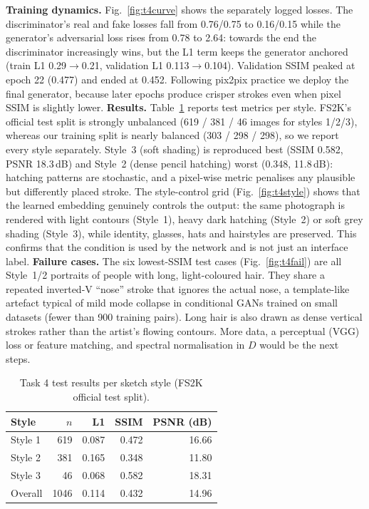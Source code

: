 \documentclass[conference]{IEEEtran}
\begin{document}
\textbf{Training dynamics.} Fig.~\ref{fig:t4curve} shows the separately logged losses. The discriminator's real and fake losses fall from 0.76/0.75 to 0.16/0.15 while the generator's adversarial loss rises from 0.78 to 2.64: towards the end the discriminator increasingly wins, but the L1 term keeps the generator anchored (train L1 0.29$\rightarrow$0.21, validation L1 0.113$\rightarrow$0.104). Validation SSIM peaked at epoch 22 (0.477) and ended at 0.452. Following pix2pix practice we deploy the final generator, because later epochs produce crisper strokes even when pixel SSIM is slightly lower.
\textbf{Results.} Table~\ref{tab:t4} reports test metrics per style. FS2K's official test split is strongly unbalanced (619 / 381 / 46 images for styles 1/2/3), whereas our training split is nearly balanced (303 / 298 / 298), so we report every style separately. Style~3 (soft shading) is reproduced best (SSIM 0.582, PSNR 18.3\,dB) and Style~2 (dense pencil hatching) worst (0.348, 11.8\,dB): hatching patterns are stochastic, and a pixel-wise metric penalises any plausible but differently placed stroke. The style-control grid (Fig.~\ref{fig:t4style}) shows that the learned embedding genuinely controls the output: the same photograph is rendered with light contours (Style~1), heavy dark hatching (Style~2) or soft grey shading (Style~3), while identity, glasses, hats and hairstyles are preserved. This confirms that the condition is used by the network and is not just an interface label.
\textbf{Failure cases.} The six lowest-SSIM test cases (Fig.~\ref{fig:t4fail}) are all Style~1/2 portraits of people with long, light-coloured hair. They share a repeated inverted-V ``nose'' stroke that ignores the actual nose, a template-like artefact typical of mild mode collapse in conditional GANs trained on small datasets (fewer than 900 training pairs). Long hair is also drawn as dense vertical strokes rather than the artist's flowing contours. More data, a perceptual (VGG) loss or feature matching, and spectral normalisation in $D$ would be the next steps.
\begin{table}[t]\centering\caption{Task 4 test results per sketch style (FS2K official test split).}\label{tab:t4}
\begin{tabular}{lrrrr}\toprule
Style & $n$ & L1 & SSIM & PSNR (dB)\\ \midrule
Style 1 & 619 & 0.087 & 0.472 & 16.66 \\
Style 2 & 381 & 0.165 & 0.348 & 11.80 \\
Style 3 & 46 & 0.068 & 0.582 & 18.31 \\
Overall & 1046 & 0.114 & 0.432 & 14.96 \\
\bottomrule\end{tabular}\end{table}
\end{document}
